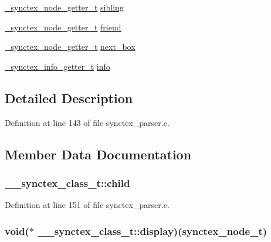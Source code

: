 \begin{DoxyCompactItemize}
\hyperlink{synctex__parser_8c_a68776561342fb5faed30d828674970dc}{\+\_\+synctex\+\_\+node\+\_\+getter\+\_\+t} \hyperlink{struct____synctex__class__t_afd60732f9f1a051b978fb0efa2d786f4}{sibling}
\item 
\hyperlink{synctex__parser_8c_a68776561342fb5faed30d828674970dc}{\+\_\+synctex\+\_\+node\+\_\+getter\+\_\+t} \hyperlink{struct____synctex__class__t_a8bbbd0ccfd3281e8209fe1bbc298cf3c}{friend}
\item 
\hyperlink{synctex__parser_8c_a68776561342fb5faed30d828674970dc}{\+\_\+synctex\+\_\+node\+\_\+getter\+\_\+t} \hyperlink{struct____synctex__class__t_a3ed475c3857e39e0d041f05ecd3bc6c5}{next\+\_\+box}
\item 
\hyperlink{synctex__parser_8c_a5ba3112f4cb4828de2bb2bb34bc69eea}{\+\_\+synctex\+\_\+info\+\_\+getter\+\_\+t} \hyperlink{struct____synctex__class__t_ad5458e975bc61bb94761e5c6dbb618f6}{info}
\end{DoxyCompactItemize}


\subsection{Detailed Description}


Definition at line 143 of file synctex\+\_\+parser.\+c.



\subsection{Member Data Documentation}
\hypertarget{struct____synctex__class__t_ace25029406ca336f39872a8b77564748}{
\subsubsection[{child}]{ \+\_\+\+\_\+synctex\+\_\+class\+\_\+t\+::child}}\label{struct____synctex__class__t_ace25029406ca336f39872a8b77564748}


Definition at line 151 of file synctex\+\_\+parser.\+c.

\hypertarget{struct____synctex__class__t_a560e0e5d2b1f56ce37b8afb179a56ec7}{
\subsubsection[{display}]{\setlength{\rightskip}{0pt plus 5cm}void($\ast$ \+\_\+\+\_\+synctex\+\_\+class\+\_\+t\+::display)({\bf synctex\+\_\+node\+\_\+t})}}\label{struct____synctex__class__t_a560e0e5d2b1f56ce37b8afb179a56ec7}


